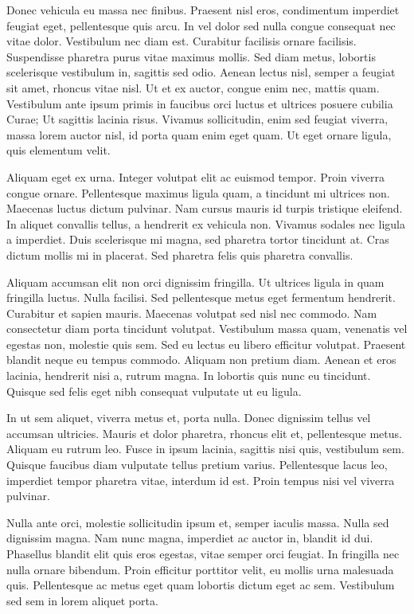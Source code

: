 \documentclass[12pt]{article}
\begin{document}
Donec vehicula eu massa nec finibus. Praesent nisl eros, condimentum imperdiet feugiat eget, pellentesque quis arcu. In vel dolor sed nulla congue consequat nec vitae dolor. Vestibulum nec diam est. Curabitur facilisis ornare facilisis. Suspendisse pharetra purus vitae maximus mollis. Sed diam metus, lobortis scelerisque vestibulum in, sagittis sed odio. Aenean lectus nisl, semper a feugiat sit amet, rhoncus vitae nisl. Ut et ex auctor, congue enim nec, mattis quam. Vestibulum ante ipsum primis in faucibus orci luctus et ultrices posuere cubilia Curae; Ut sagittis lacinia risus. Vivamus sollicitudin, enim sed feugiat viverra, massa lorem auctor nisl, id porta quam enim eget quam. Ut eget ornare ligula, quis elementum velit.

Aliquam eget ex urna. Integer volutpat elit ac euismod tempor. Proin viverra congue ornare. Pellentesque maximus ligula quam, a tincidunt mi ultrices non. Maecenas luctus dictum pulvinar. Nam cursus mauris id turpis tristique eleifend. In aliquet convallis tellus, a hendrerit ex vehicula non. Vivamus sodales nec ligula a imperdiet. Duis scelerisque mi magna, sed pharetra tortor tincidunt at. Cras dictum mollis mi in placerat. Sed pharetra felis quis pharetra convallis.

Aliquam accumsan elit non orci dignissim fringilla. Ut ultrices ligula in quam fringilla luctus. Nulla facilisi. Sed pellentesque metus eget fermentum hendrerit. Curabitur et sapien mauris. Maecenas volutpat sed nisl nec commodo. Nam consectetur diam porta tincidunt volutpat. Vestibulum massa quam, venenatis vel egestas non, molestie quis sem. Sed eu lectus eu libero efficitur volutpat. Praesent blandit neque eu tempus commodo. Aliquam non pretium diam. Aenean et eros lacinia, hendrerit nisi a, rutrum magna. In lobortis quis nunc eu tincidunt. Quisque sed felis eget nibh consequat vulputate ut eu ligula.

In ut sem aliquet, viverra metus et, porta nulla. Donec dignissim tellus vel accumsan ultricies. Mauris et dolor pharetra, rhoncus elit et, pellentesque metus. Aliquam eu rutrum leo. Fusce in ipsum lacinia, sagittis nisi quis, vestibulum sem. Quisque faucibus diam vulputate tellus pretium varius. Pellentesque lacus leo, imperdiet tempor pharetra vitae, interdum id est. Proin tempus nisi vel viverra pulvinar.

Nulla ante orci, molestie sollicitudin ipsum et, semper iaculis massa. Nulla sed dignissim magna. Nam nunc magna, imperdiet ac auctor in, blandit id dui. Phasellus blandit elit quis eros egestas, vitae semper orci feugiat. In fringilla nec nulla ornare bibendum. Proin efficitur porttitor velit, eu mollis urna malesuada quis. Pellentesque ac metus eget quam lobortis dictum eget ac sem. Vestibulum sed sem in lorem aliquet porta.
\end{document}
